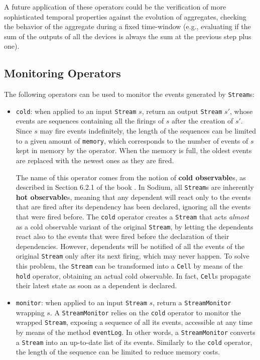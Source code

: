 A future application of these operators could be the verification of more
sophisticated temporal properties against the evolution of aggregates, checking
the behavior of the aggregate during a fixed time-window (e.g., evaluating if
the sum of the outputs of all the devices is always the sum at the previous
step plus one).

\subsection{Monitoring Operators}

The following operators can be used to monitor the events generated by
\texttt{Stream}s:
\begin{itemize}
  \item \texttt{cold}: when applied to an input \texttt{Stream} $s$, return an
        output \texttt{Stream} $s'$, whose events are sequences containing all
        the firings of $s$ after the creation of $s'$. Since $s$ may fire
        events indefinitely, the length of the sequences can be limited to a
        given amount of \texttt{memory}, which corresponds to the number of
        events of $s$ kept in memory by the operator. When the memory is full,
        the oldest events are replaced with the newest ones as they are fired.

        The name of this operator comes from the notion of \textbf{cold
        observable}s, as described in Section 6.2.1 of the book \cite{FRP}. In
        Sodium, all \texttt{Stream}s are inherently \textbf{hot observable}s,
        meaning that any dependent will react only to the events that are fired
        after its dependency has been declared, ignoring all the events that
        were fired before. The \texttt{cold} operator creates a \texttt{Stream}
        that acts \textit{almost} as a cold observable variant of the original
        \texttt{Stream}, by letting the dependents react also to the events
        that were fired before the declaration of their dependencies. However,
        dependents will be notified of all the events of the original
        \texttt{Stream} only after its next firing, which may never happen. To
        solve this problem, the \texttt{Stream} can be transformed into a
        \texttt{Cell} by means of the \texttt{hold} operator, obtaining an
        actual cold observable. In fact, \texttt{Cell}s propagate their latest
        state as soon as a dependent is declared.

  \item \texttt{monitor}: when applied to an input \texttt{Stream} $s$, return
        a \texttt{StreamMonitor} wrapping $s$. A \texttt{StreamMonitor} relies
        on the \texttt{cold} operator to monitor the wrapped \texttt{Stream},
        exposing a sequence of all its events, accessible at any time by means
        of the method \texttt{eventLog}. In other words, a
        \texttt{StreamMonitor} converts a \texttt{Stream} into an up-to-date
        list of its events. Similarly to the \texttt{cold} operator, the length
        of the sequence can be limited to reduce memory costs.
\end{itemize}

